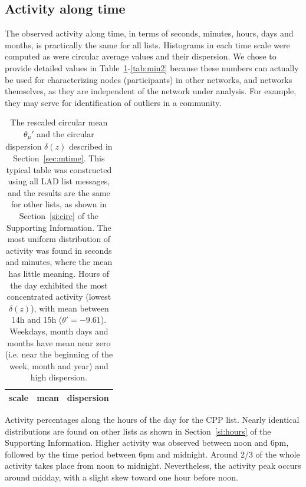 \documentclass[%
	aip,
	jmp,%
	amsmath,amssymb,
	reprint,%
]{revtex4-1}
\begin{document}
\subsection{Activity along time}\label{constDisc}
The observed activity along time, in terms of seconds, minutes, hours, days and months,  is practically the same for all lists.
Histograms in each time scale were computed as were circular average values and their dispersion.
We chose to provide detailed values in Table~\ref{tab:circ}-\ref{tab:min2} because these numbers can actually be used for characterizing nodes (participants) in other networks, and networks themselves, as they are independent of the network under analysis. For example, they may serve for identification of outliers in a community.

\begin{table}
	\caption{The rescaled circular mean $\theta_\mu'$ and the circular dispersion $\delta(z)$ described in Section~\ref{sec:mtime}.
		This typical table was constructed using all LAD list messages, and the results are the same for other lists, as shown in Section~\ref{si:circ} of the Supporting Information.
	The most uniform distribution of activity was found in seconds and minutes, where the mean has little meaning.
	Hours of the day exhibited the most concentrated activity (lowest $\delta(z)$), with mean between 14h and 15h ($\theta'=-9.61$).
	Weekdays, month days and months have mean near zero (i.e. near the beginning of the week, month and year) and high dispersion.}
	\begin{center}
		\begin{tabular}{ |l|| c|c| }
			\hline
			{\bf scale} & {\bf mean} \boldsymbol{$\theta_\mu'$} & {\bf dispersion} \boldsymbol{$\delta(z)$ }  \\ \hline\hline
			
		\end{tabular}
	\end{center}
	\label{tab:circ}
\end{table}

\begin{table}
	\caption{Activity percentages along the hours of the day for the CPP list. Nearly identical distributions are found on other lists as shown in Section~\ref{si:hours} of the Supporting Information. Higher activity was observed between noon and 6pm, followed by the time period between 6pm and midnight. Around 2/3 of the whole activity takes place from noon to midnight. Nevertheless, the activity peak occurs around midday, with a slight skew toward one hour before noon.}
	\footnotesize
	
	\label{tab:hin}
\end{table}
\end{document}
